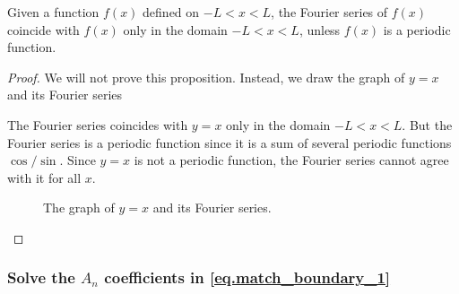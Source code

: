 \begin{proposition}[]
    Given a function $f(x)$ defined on $-L < x < L$, the Fourier series of $f(x)$ coincide with $f(x)$ only in the domain $-L < x < L$, unless $f(x)$ is a periodic function.
\end{proposition}
\begin{proof}
    We will not prove this proposition. Instead, we draw the graph of $y = x$ and its Fourier series

    The Fourier series coincides with $y = x$ only in the domain $-L < x < L$. But the Fourier series is a periodic function since it is a sum of several periodic functions $\cos/\sin$. Since $y = x$ is not a periodic function, the Fourier series cannot agree with it for all $x$.
    \begin{figure}[H]
        \centering 
        \caption{The graph of $y = x$ and its Fourier series.} 
        \label{fig.fourier_x} 
    \end{figure}
\end{proof}


\subsubsection{Solve the $A_n$ coefficients in \eqref{eq.match_boundary_1}}\label{sec.A_n_coef_sep} 

